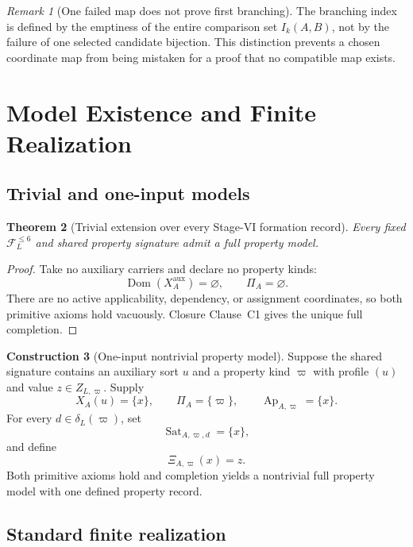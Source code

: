 \documentclass[11pt]{article}
\newcommand{\FVI}{\mathcal F_{L}^{\le 6}}
\newcommand{\Ap}{\operatorname{Ap}}
\newcommand{\Sat}{\operatorname{Sat}}
\newcommand{\Dom}{\operatorname{Dom}}
\newtheorem{theorem}{Theorem}[section]
\theoremstyle{definition}
\newtheorem{construction}[theorem]{Construction}
\theoremstyle{remark}
\newtheorem{remark}[theorem]{Remark}
\begin{document}
\begin{remark}[One failed map does not prove first branching]
The branching index is defined by the emptiness of the entire comparison set \(I_k(A,B)\), not by the failure of one selected candidate bijection.
This distinction prevents a chosen coordinate map from being mistaken for a proof that no compatible map exists.
\end{remark}

\section{Model Existence and Finite Realization}
\label{sec:finite}

\subsection{Trivial and one-input models}

\begin{theorem}[Trivial extension over every Stage-VI formation record]
\label{thm:trivial-extension}
Every fixed \(\FVI\) and shared property signature admit a full property model.
\end{theorem}

\begin{proof}
Take no auxiliary carriers and declare no property kinds:
\[
\Dom(X_A^{\mathrm{aux}})=\varnothing,
\qquad
\Pi_A=\varnothing.
\]
There are no active applicability, dependency, or assignment coordinates, so both primitive axioms hold vacuously.
Closure Clause~C1 gives the unique full completion.
\end{proof}

\begin{construction}[One-input nontrivial property model]
Suppose the shared signature contains an auxiliary sort \(u\) and a property kind \(\varpi\) with profile \((u)\) and value \(z\in Z_{L,\varpi}\).
Supply
\[
X_A(u)=\{x\},
\qquad
\Pi_A=\{\varpi\},
\qquad
\Ap_{A,\varpi}=\{x\}.
\]
For every \(d\in\delta_L(\varpi)\), set
\[
\Sat_{A,\varpi,d}=\{x\},
\]
and define
\[
\Xi_{A,\varpi}(x)=z.
\]
Both primitive axioms hold and completion yields a nontrivial full property model with one defined property record.
\end{construction}

\subsection{Standard finite realization}
\end{document}
